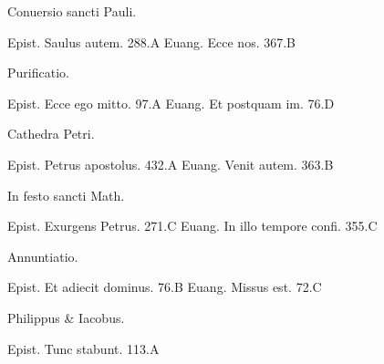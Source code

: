 \documentclass[a5paper,10pt]{book}
\begin{document}
\begin{multicols}{2}
\begin{center}
\color{red} Conuersio sancti Pauli.
\end{center}
\vspace{-.75em}
\par \noindent Epist. Saulus autem. \hfill 288.A
\newline Euang. Ecce nos. \hfill 367.B
\newline \vspace{-1.75em}
\begin{center}
\color{red} Purificatio.
\end{center}
\vspace{-.75em}
\par \noindent Epist. Ecce ego mitto. \hfill 97.A
\newline Euang. Et postquam im. \hfill 76.D
\newline \vspace{-1.75em}
\begin{center}
\color{red} Cathedra Petri.
\end{center}
\vspace{-.75em}
\par \noindent Epist. Petrus apostolus. \hfill 432.A
\newline Euang. Venit autem. \hfill 363.B
\newline \vspace{-1.75em}
\begin{center}
\color{red} In festo sancti Math.
\end{center}
\vspace{-.75em}
\par \noindent Epist. Exurgens Petrus. \hfill 271.C
\newline Euang. In illo tempore confi. \hfill 355.C
\newline \vspace{-1.75em}
\begin{center}
\color{red} Annuntiatio.
\end{center}
\vspace{-.75em}
\par \noindent Epist. Et adiecit dominus. \hfill 76.B
\newline Euang. Missus est. \hfill 72.C
\newline \vspace{-1.75em}
\begin{center}
\color{red} Philippus \& Iacobus.
\end{center}
\vspace{-.75em}
\par \noindent Epist. Tunc stabunt. \hfill 113.A

\end{multicols}
\end{document}
